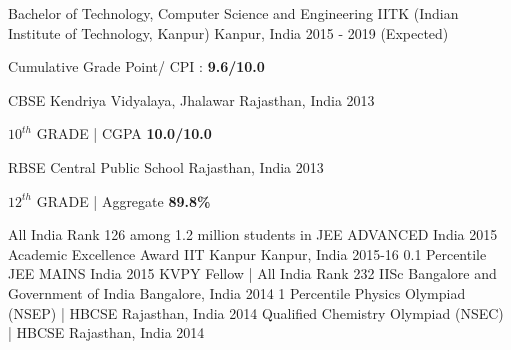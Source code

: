 \documentclass[12pt, a4paper]{awesome-cv}
\begin{document}
\makecvheader
\begin{cventries}
  \cventry
    {Bachelor of Technology, Computer Science and Engineering}
    {IITK (Indian Institute of Technology, Kanpur)}
    {Kanpur, India}
    {2015 - 2019 (Expected)}
    {
      \begin{cvitems}
        \item {Cumulative Grade Point/ CPI :\textbf{ 9.6/10.0} }
      \end{cvitems}
    }
    \vspace{0.2cm}
  \cventry
    {CBSE}
    {Kendriya Vidyalaya, Jhalawar}
    {Rajasthan, India}
    {2013}
    {
      \begin{cvitems}
        \item {$10 ^{th}$ GRADE | CGPA \textbf{10.0/10.0}}      
      \end{cvitems} 
    }
    \vspace{0.2cm}
  \cventry
    {RBSE}
    {Central Public School}
    {Rajasthan, India}
    {2013}
    {
      \begin{cvitems}
        \item {$12 ^{th}$ GRADE | Aggregate \textbf{89.8\%}}      
      \end{cvitems} 
    }

\end{cventries}
\vspace{-0.3cm}
\begin{cvhonors}
  \cvhonor
    {All India Rank 126}
    {among 1.2 million students in JEE ADVANCED}
    {India}
    {2015}
  \cvhonor
    {Academic Excellence Award}
    {IIT Kanpur}
    {Kanpur, India}
    {2015-16}
  \cvhonor
    {0.1 Percentile}
    {JEE MAINS}
    {India}
    {2015}
  \cvhonor
    {KVPY Fellow | All India Rank 232}
    {IISc Bangalore and Government of India}
    {Bangalore, India}
    {2014}
  \cvhonor
    {1 Percentile}
    {Physics Olympiad (NSEP) | HBCSE}    
    {Rajasthan, India}
    {2014}  
  \cvhonor
    {Qualified}
    {Chemistry Olympiad (NSEC) | HBCSE}
    {Rajasthan, India}
    {2014}

\end{cvhonors}
\end{document}
